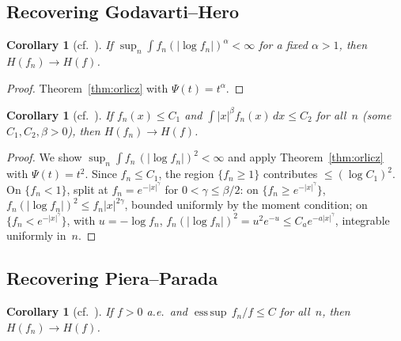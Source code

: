 \documentclass[journal]{IEEEtran}
\newtheorem{corollary}[theorem]{Corollary}
\theoremstyle{definition}
\theoremstyle{remark}
\newcommand{\1}{\mathbf{1}}
\newcommand{\Hent}{H}
\newcommand{\abs}[1]{\lvert #1 \rvert}
\newcommand{\dx}{\,dx}
\DeclareMathOperator*{\esssup}{ess\,sup}
\begin{document}
\subsection{Recovering Godavarti--Hero}

\begin{corollary}[cf.\ {\cite[Theorem~4]{GodavartiHero2004}}]
  \label{cor:GH4}
If $\sup_n \int f_n (\abs{\log f_n})^\alpha < \infty$ for a fixed
$\alpha > 1$, then $\Hent(f_n) \to \Hent(f)$.
\end{corollary}

\begin{proof}
Theorem~\ref{thm:orlicz} with $\Psi(t) = t^\alpha$.
\end{proof}

\begin{corollary}[cf.\ {\cite[Theorem~1]{GodavartiHero2004}}]
  \label{cor:GH1}
If $f_n(x) \leq C_1$ and
$\int \abs{x}^\beta f_n(x) \dx \leq C_2$ for all~$n$
(some $C_1, C_2, \beta > 0$), then $\Hent(f_n) \to \Hent(f)$.
\end{corollary}

\begin{proof}
We show $\sup_n \int f_n\, (\abs{\log f_n})^2 < \infty$ and apply
Theorem~\ref{thm:orlicz} with $\Psi(t) = t^2$.
Since $f_n \leq C_1$, the region $\{f_n \geq 1\}$ contributes
$\leq (\log C_1)^2$.
On $\{f_n < 1\}$, split at $f_n = e^{-\abs{x}^\gamma}$ for
$0 < \gamma \leq \beta/2$:
on $\{f_n \geq e^{-\abs{x}^\gamma}\}$,
$f_n (\abs{\log f_n})^2 \leq f_n \abs{x}^{2\gamma}$, bounded
uniformly by the moment condition;
on $\{f_n < e^{-\abs{x}^\gamma}\}$, with $u = -\log f_n$,
$f_n (\abs{\log f_n})^2 = u^2 e^{-u} \leq C_a e^{-a\abs{x}^\gamma}$,
integrable uniformly in~$n$.
\end{proof}

\subsection{Recovering Piera--Parada}

\begin{corollary}[cf.\ {\cite[Theorem~IV.1]{PieraParada2009}}]
  \label{cor:PP}
If $f > 0$ a.e.\ and $\esssup\, f_n/f \leq C$ for all~$n$, then
$\Hent(f_n) \to \Hent(f)$.
\end{corollary}
\end{document}
